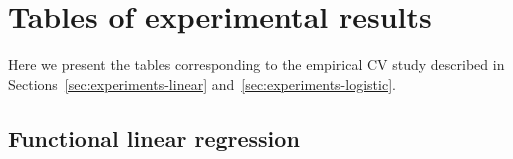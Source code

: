 %
%

\chapter{Tables of experimental results}\label{ch:tables}

Here we present the tables corresponding to the empirical CV study described in Sections~\ref{sec:experiments-linear} and~\ref{sec:experiments-logistic}.

\section*{Functional linear regression}

